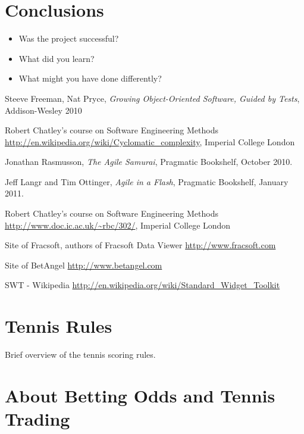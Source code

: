 \documentclass[10pt]{report}
\begin{document}
\chapter{Conclusions}
  \begin{itemize} 
  \item Was the project successful?
  \item What did you learn?
  \item What might you have done differently?
  \end{itemize}  

\begin{thebibliography}{9}
  Steeve Freeman, Nat Pryce,
  \emph{Growing Object-Oriented Software, Guided by Tests}, Addison-Wesley 2010

  Robert Chatley's course on Software Engineering Methods
  \url{http://en.wikipedia.org/wiki/Cyclomatic_complexity},
  Imperial College London

  Jonathan Rasmusson,
  \emph{The Agile Samurai},
  Pragmatic Bookshelf,
  October 2010.

  Jeff Langr and Tim Ottinger,
  \emph{Agile in a Flash},
  Pragmatic Bookshelf, 
  January 2011.

  Robert Chatley's course on Software Engineering Methods
  \url{http://www.doc.ic.ac.uk/~rbc/302/},
  Imperial College London

  Site of Fracsoft, authors of Fracsoft Data Viewer
  \url{http://www.fracsoft.com}

  Site of BetAngel
  \url{http://www.betangel.com}
  
  SWT - Wikipedia
  \url{http://en.wikipedia.org/wiki/Standard_Widget_Toolkit}

\end{thebibliography}

\clearpage
\appendix

\chapter{Tennis Rules}

Brief overview of the tennis scoring rules.

\chapter{About Betting Odds and Tennis Trading}
\end{document}
